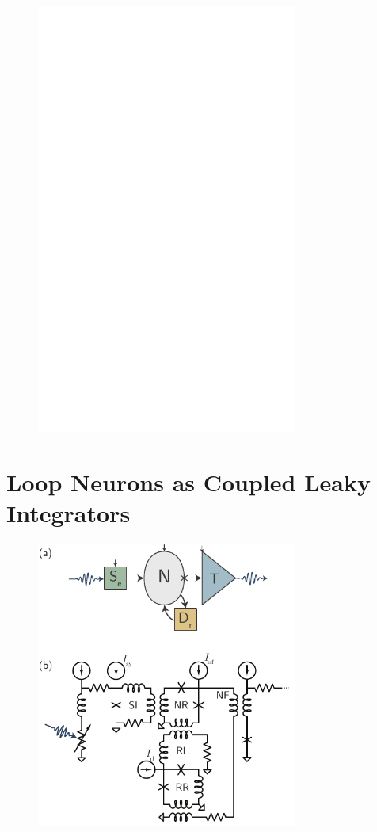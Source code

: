 \documentclass[twocolumn]{article}
\begin{document}
\begin{figure}[h!]
\includegraphics[width=8.6cm]{figures/_fig__dendrites__error_vs_dt__4jj.pdf}
\end{figure}

\section{\label{sec:neurons}Loop Neurons as Coupled Leaky Integrators}

\begin{figure}[h!]
\includegraphics[width=8.6cm]{figures/_fig__point_neuron__one_synapse__schematic__circuit.pdf}
\end{figure}
\end{document}
